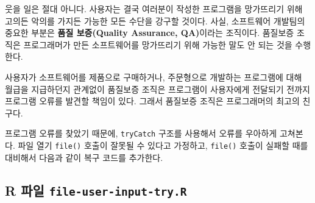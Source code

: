 \documentclass[
  letterpaper,
]{book}
\begin{document}
웃을 일은 절대 아니다. 사용자는 결국 여러분이 작성한 프로그램을
망가뜨리기 위해 고의든 악의를 가지든 가능한 모든 수단을 강구할 것이다.
사실, 소프트웨어 개발팀의 중요한 부분은 \textbf{품질 보증(Quality
Assurance, QA)}이라는 조직이다. 품질보증 조직은 프로그래머가 만든
소프트웨어를 망가뜨리기 위해 가능한 말도 안 되는 것을 수행한다.
 

사용자가 소프트웨어를 제품으로 구매하거나, 주문형으로 개발하는
프로그램에 대해 월급을 지급하던지 관계없이 품질보증 조직은 프로그램이
사용자에게 전달되기 전까지 프로그램 오류를 발견할 책임이 있다. 그래서
품질보증 조직은 프로그래머의 최고의 친구다.

프로그램 오류를 찾았기 때문에, \texttt{tryCatch} 구조를 사용해서 오류를
우아하게 고쳐본다. 파일 열기 \texttt{file()} 호출이 잘못될 수 있다고
가정하고, \texttt{file()} 호출이 실패할 때를 대비해서 다음과 같이 복구
코드를 추가한다.  
  

\subsection{\texorpdfstring{R 파일
\texttt{file-user-input-try.R}}{R 파일 file-user-input-try.R}}\label{r-uxd30cuxc77c-file-user-input-try.r}
\end{document}
